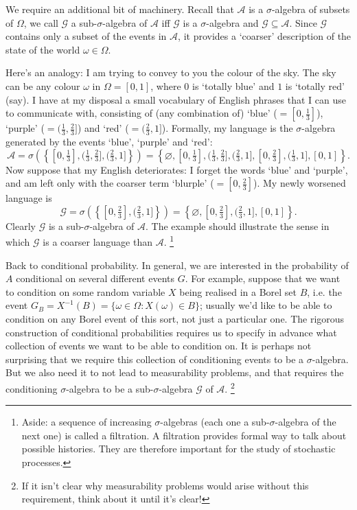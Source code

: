 \documentclass[11pt,letterpaper,reqno,oneside]{article}
\begin{document}
We require an additional bit of machinery. Recall that $\mathcal{A}$ is a $\sigma$-algebra of subsets of $\Omega$, we call $\mathcal{G}$ a sub-$\sigma$-algebra of $\mathcal{A}$ iff $\mathcal{G}$ is a $\sigma$-algebra and $\mathcal{G} \subseteq \mathcal{A}$. Since $\mathcal{G}$ contains only a subset of the events in $\mathcal{A}$, it provides a `coarser' description of the state of the world $\omega \in \Omega$.

Here's an analogy: I am trying to convey to you the colour of the sky. The sky can be any colour $\omega$ in $\Omega = [0,1]$, where $0$ is `totally blue' and $1$ is `totally red' (say). I have at my disposal a small vocabulary of English phrases that I can use to communicate with, consisting of (any combination of) `blue' ($=[0,\tfrac{1}{3}]$), `purple' ($=(\tfrac{1}{3},\tfrac{2}{3}]$) and `red' ($=(\tfrac{2}{3},1]$). Formally, my language is the $\sigma$-algebra generated by the events `blue', `purple' and `red':
%
\begin{equation*}
	\mathcal{A}
	= \sigma\left( \left\{ [0,\tfrac{1}{3}], (\tfrac{1}{3},\tfrac{2}{3}], (\tfrac{2}{3},1] \right\} \right)
	= \left\{ \varnothing, [0,\tfrac{1}{3}], (\tfrac{1}{3},\tfrac{2}{3}], (\tfrac{2}{3},1], [0,\tfrac{2}{3}], (\tfrac{1}{3},1], [0,1] \right\} .
\end{equation*}
%
Now suppose that my English deteriorates: I forget the words `blue' and `purple', and am left only with the coarser term `blurple' ($=[0,\tfrac{2}{3}]$). My newly worsened language is
%
\begin{equation*}
	\mathcal{G}
	= \sigma\left( \left\{ [0,\tfrac{2}{3}], (\tfrac{2}{3},1] \right\} \right)
	= \left\{ \varnothing, [0,\tfrac{2}{3}], (\tfrac{2}{3},1], [0,1] \right\} .
\end{equation*}
%
Clearly $\mathcal{G}$ is a sub-$\sigma$-algebra of $\mathcal{A}$. The example should illustrate the sense in which $\mathcal{G}$ is a coarser language than $\mathcal{A}$.%
	\footnote{Aside: a sequence of increasing $\sigma$-algebras (each one a sub-$\sigma$-algebra of the next one) is called a filtration. A filtration provides formal way to talk about possible histories. They are therefore important for the study of stochastic processes.}

Back to conditional probability. In general, we are interested in the probability of $A$ conditional on several different events $G$. For example, suppose that we want to condition on some random variable $X$ being realised in a Borel set $B$, i.e. the event $G_B = X^{-1}(B) = \{ \omega \in \Omega : X(\omega) \in B \}$; usually we'd like to be able to condition on any Borel event of this sort, not just a particular one. The rigorous construction of conditional probabilities requires us to specify in advance what collection of events we want to be able to condition on. It is perhaps not surprising that we require this collection of conditioning events to be a $\sigma$-algebra. But we also need it to not lead to measurability problems, and that requires the conditioning $\sigma$-algebra to be a sub-$\sigma$-algebra $\mathcal{G}$ of $\mathcal{A}$.%
	\footnote{If it isn't clear why measurability problems would arise without this requirement, think about it until it's clear!}
\end{document}

